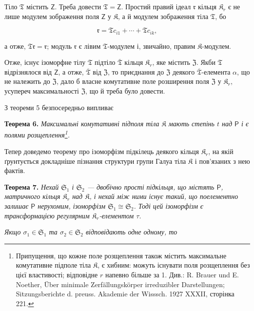 \documentclass[11pt]{article}
\newcommand{\srcfn}[2]{\footnote{#2}}
\begin{document}
Тіло \(\mathfrak T\) містить \(\mathsf{Z}\). Треба довести \(\mathfrak T=\mathsf{Z}\). Простий правий ідеал \(\mathfrak r\) кільця \(\mathfrak K_r\) є не лише модулем зображення поля \(\mathsf{Z}\) у \(\mathfrak K\), а й модулем зображення тіла \(\mathfrak T\), бо

\[
\mathfrak r=\mathfrak T c_{i1}+\cdots+\mathfrak T c_{ik},
\]

а отже, \(\mathfrak T\mathfrak r=\mathfrak r\); модуль \(\mathfrak r\) є лівим \(\mathfrak T\)-модулем і, звичайно, правим \(\mathfrak K\)-модулем.

Отже, існує ізоморфне тілу \(\mathfrak T\) підтіло \(\overline{\mathfrak T}\) кільця \(\mathfrak K_r\), яке містить \(\mathfrak Z\). Якби \(\mathfrak T\) відрізнялося від \(\mathsf{Z}\), а отже, \(\overline{\mathfrak T}\) від \(\mathfrak Z\), то приєднання до \(\mathfrak Z\) деякого \(\overline{\mathfrak T}\)-елемента \(\alpha\), що не належить до \(\mathfrak Z\), дало б власне комутативне поле розширення поля \(\mathfrak Z\) у \(\mathfrak K_r\), усупереч максимальності \(\mathfrak Z\), що й треба було довести.

З теореми 5 безпосередньо випливає

\textbf{Теорема 6.} \emph{Максимальні комутативні підполя тіла \(\mathfrak K\) мають степінь \(t\) над \(\mathsf P\) і є полями розщеплення\srcfn{1}{Припущення, що кожне поле розщеплення також містить максимальне комутативне підполе тіла \(\mathfrak K\), є хибним: можуть існувати поля розщеплення без цієї властивості; відповідне \(r\) напевно більше за 1. Див.: R. Brauer und E. Noether, Über minimale Zerfällungskörper irreduzibler Darstellungen; Sitzungsberichte d. preuss. Akademie der Wisssch. 1927 XXXII, сторінка 221.}.}

Тепер доведемо теорему про ізоморфізм підкілець деякого кільця \(\mathfrak K_r\), на якій ґрунтується докладніше пізнання структури групи Галуа тіла \(\mathfrak K\) і пов'язаних з нею фактів.

\textbf{Теорема 7.} \emph{Нехай \(\mathfrak S_1\) і \(\mathfrak S_2\) --- двобічно прості підкільця, що містять \(\mathsf P\), матричного кільця \(\mathfrak K_r\) над \(\mathfrak K\), і нехай між ними існує такий, що поелементно залишає \(\mathsf P\) нерухомим, ізоморфізм \(\mathfrak S_1\cong\mathfrak S_2\). Тоді цей ізоморфізм є трансформацією регулярним \(\mathfrak K_r\)-елементом \(\tau\).}

\emph{Якщо \(\sigma_1\in\mathfrak S_1\) та \(\sigma_2\in\mathfrak S_2\) відповідають одне одному, то}
\end{document}
